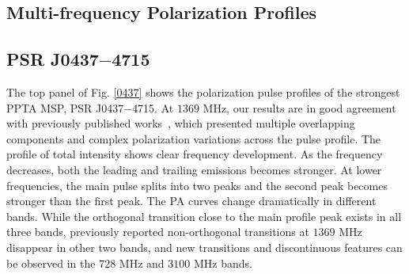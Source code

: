 \documentclass[useAMS,usenatbib]{mn2e}
\begin{document}
\begin{appendices}

\section{Multi-frequency Polarization Profiles}
\subsection{PSR J0437$-$4715}

The top panel of Fig. \ref{0437} shows the polarization pulse profiles of the 
strongest PPTA MSP, PSR J0437$-$4715.
%
At $1369$ MHz, our results are in good agreement with previously published 
works~\citep{Johnston93,Manchester95_1,Navarro97,Yan11}, which presented 
multiple overlapping components and complex polarization variations across 
the pulse profile. 
%
%
The profile of total intensity shows clear frequency development. As the 
frequency decreases, both the leading and trailing emissions becomes stronger.
%
At lower frequencies, the main pulse splits into two peaks and the second peak
becomes stronger than the first peak.
%
The PA curves change dramatically in different bands. While the orthogonal 
transition close to the main profile peak exists in all three bands, previously
reported non-orthogonal transitions at $1369$ MHz disappear in other two bands,
and new transitions and discontinuous features can be observed in the $728$ MHz 
and $3100$ MHz bands.
%



\end{appendices}
\end{document}
